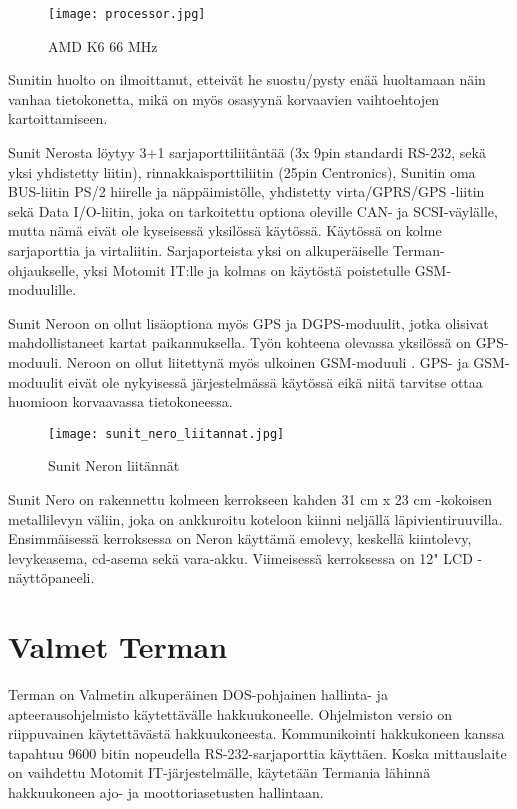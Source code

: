 \begin{figure}[H]
\centering
\texttt{[image: processor.jpg]}
\caption{AMD K6 66 MHz}
\end{figure}

Sunitin huolto on ilmoittanut, etteivät he suostu/pysty enää huoltamaan näin vanhaa tietokonetta, mikä on myös osasyynä korvaavien vaihtoehtojen kartoittamiseen.

Sunit Nerosta löytyy 3+1 sarjaporttiliitäntää (3x 9pin standardi RS-232, sekä yksi yhdistetty liitin), rinnakkaisporttiliitin (25pin Centronics), Sunitin oma BUS-liitin PS/2 hiirelle ja näppäimistölle, yhdistetty virta/GPRS/GPS -liitin sekä Data I/O-liitin, joka on tarkoitettu optiona oleville CAN- ja SCSI-väylälle, mutta nämä eivät ole kyseisessä yksilössä käytössä.  Käytössä on kolme sarjaporttia ja virtaliitin. Sarjaporteista yksi on alkuperäiselle Terman-ohjaukselle, yksi Motomit IT:lle ja kolmas on käytöstä poistetulle GSM-moduulille.

Sunit Neroon on ollut lisäoptiona myös GPS ja DGPS-moduulit, jotka olisivat mahdollistaneet kartat paikannuksella. Työn kohteena olevassa yksilössä on GPS-moduuli. Neroon on ollut liitettynä myös ulkoinen GSM-moduuli \cite{nero:manual}. GPS- ja GSM-moduulit eivät ole nykyisessä järjestelmässä käytössä eikä niitä tarvitse ottaa huomioon korvaavassa tietokoneessa.\newline\newline

\begin{figure}[H]
\centering
\texttt{[image: sunit\_nero\_liitannat.jpg]}
\caption{Sunit Neron liitännät}
\end{figure}

Sunit Nero on rakennettu kolmeen kerrokseen kahden 31 cm x 23 cm -kokoisen metallilevyn väliin, joka on ankkuroitu koteloon kiinni neljällä  läpivientiruuvilla. Ensimmäisessä kerroksessa on Neron käyttämä emolevy, keskellä kiintolevy, levykeasema, cd-asema sekä vara-akku. Viimeisessä kerroksessa on 12" LCD -näyttöpaneeli.

\section{Valmet Terman}
Terman on Valmetin alkuperäinen DOS-pohjainen hallinta- ja apteerausohjelmisto käytettävälle hakkuukoneelle. Ohjelmiston versio on riippuvainen käytettävästä hakkuukoneesta. Kommunikointi hakkukoneen kanssa tapahtuu 9600 bitin nopeudella RS-232-sarjaporttia käyttäen. Koska mittauslaite on vaihdettu Motomit IT-järjestelmälle, käytetään Termania lähinnä hakkuukoneen ajo- ja moottoriasetusten hallintaan.
\newline\newline

